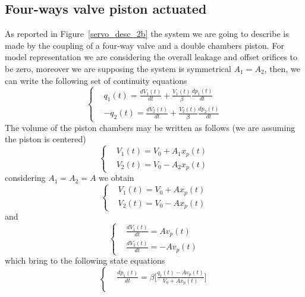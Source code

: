 \documentclass[12pt,a4paper,oneside]{book}
\begin{document}
\begin{onehalfspace}
\subsection{Four-ways valve piston actuated}
As reported in Figure~\ref{servo_desc_2b} the system we are going to describe is made by the coupling of a four-way valve and a double chambers piston. For model representation we are considering the overall leakage and offset orifices to be zero, moreover we are supposing the system is symmetrical $A_1=A_2$, then, we can write the following set of continuity equations
\begin{equation}\label{continuity_1}
	\left\lbrace \begin{aligned}
		& q_1(t) = \frac{dV_1(t)}{dt} + \frac{V_1(t)}{\beta}\frac{dp_1(t)}{dt}\\[6pt]
		& -q_2(t) = \frac{dV_2(t)}{dt} + \frac{V_2(t)}{\beta}\frac{dp_2(t)}{dt}
	\end{aligned}\right. 
\end{equation} 
The volume of the piston chambers may be written as follows (we are assuming the piston is centered)
\begin{equation}\label{continuity_2}
	\left\lbrace \begin{aligned}
		& V_1(t) = V_0+A_1x_p(t)\\[6pt]
		& V_2(t) = V_0-A_2x_p(t)
	\end{aligned}\right. 
\end{equation} 
considering $A_1=A_2=A$ we obtain
\begin{equation}\label{continuity_3}
	\left\lbrace \begin{aligned}
		& V_1(t) = V_0+Ax_p(t)\\[6pt]
		& V_2(t) = V_0-Ax_p(t)
	\end{aligned}\right. 
\end{equation} 
and 
\begin{equation}\label{continuity_4}
	\left\lbrace \begin{aligned}
		& \frac{dV_1(t)}{dt} = Av_p(t)\\[6pt]
		& \frac{dV_2(t)}{dt} = -Av_p(t)
	\end{aligned}\right. 
\end{equation} 
which bring to the following state equations
\begin{equation}\label{piston_eq_1}
	\left\lbrace \begin{aligned}
		&\frac{dp_1(t)}{dt} = \beta\Bigg[\frac{q_1(t)-Av_p(t)}{V_0+Ax_p(t)}\Bigg]  \\[6pt]

\end{aligned}
\end{equation}
\end{onehalfspace}
\end{document}

